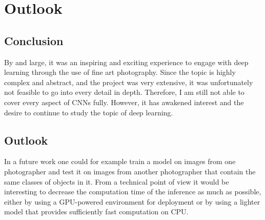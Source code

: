 \chapter{Outlook}
\label{ch:outlook}

\section{Conclusion}

By and large, it was an inspiring and exciting experience to engage with deep learning through the use of fine art photography. Since the topic is highly complex and abstract, and the project was very extensive, it was unfortunately not feasible to go into every detail in depth. Therefore, I am still not able to cover every aspect of CNNs fully. However, it has awakened interest and the desire to continue to study the topic of deep learning.

\section{Outlook}

In a future work one could for example train a model on images from one photographer and test it on images from another photographer that contain the same classes of objects in it. From a technical point of view it would be interesting to decrease the computation time of the inference as much as possible, either by using a GPU-powered environment for deployment or by using a lighter model that provides sufficiently fast computation on CPU.